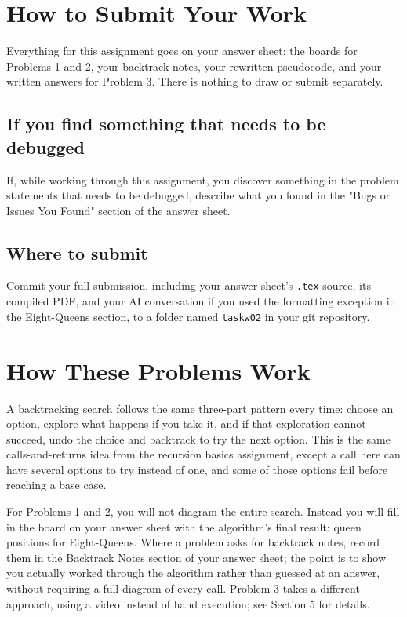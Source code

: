 \documentclass[11pt]{article}
\begin{document}
\section{How to Submit Your Work}
Everything for this assignment goes on your answer sheet: the boards for
Problems 1 and 2, your backtrack notes, your rewritten pseudocode, and your
written answers for Problem 3. There is nothing to draw or submit
separately.

\subsection*{If you find something that needs to be debugged}
If, while working through this assignment, you discover something in the
problem statements that needs to be debugged, describe what you found in
the "Bugs or Issues You Found" section of the answer sheet.

\subsection*{Where to submit}
Commit your full submission, including your answer sheet's \texttt{.tex}
source, its compiled PDF, and your AI conversation if you used the
formatting exception in the Eight-Queens section, to a folder named
\texttt{taskw02} in your git repository.

\section{How These Problems Work}

A backtracking search follows the same three-part pattern every time: choose
an option, explore what happens if you take it, and if that exploration
cannot succeed, undo the choice and backtrack to try the next option. This is
the same calls-and-returns idea from the recursion basics assignment, except
a call here can have several options to try instead of one, and some of
those options fail before reaching a base case.

For Problems 1 and 2, you will not diagram the entire search. Instead you
will fill in the board on your answer sheet with the algorithm's final
result: queen positions for Eight-Queens. Where a problem asks for
backtrack notes, record them in the Backtrack Notes section of your answer
sheet; the point is to show you actually worked through the algorithm
rather than guessed at an answer, without requiring a full diagram of every
call. Problem 3 takes a different approach, using a video instead of hand
execution; see Section 5 for details.
\end{document}
